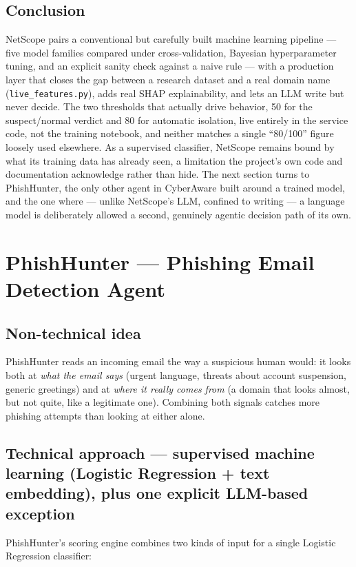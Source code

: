 \documentclass[12pt,a4paper]{report}
\newcommand{\ProjectName}{CyberAware}
\begin{document}
\subsection*{Conclusion}
NetScope pairs a conventional but carefully built machine learning pipeline --- five model families compared under cross-validation, Bayesian hyperparameter tuning, and an explicit sanity check against a naive rule --- with a production layer that closes the gap between a research dataset and a real domain name (\texttt{live\_features.py}), adds real SHAP explainability, and lets an LLM write but never decide. The two thresholds that actually drive behavior, 50 for the suspect/normal verdict and 80 for automatic isolation, live entirely in the service code, not the training notebook, and neither matches a single ``80/100'' figure loosely used elsewhere. As a supervised classifier, NetScope remains bound by what its training data has already seen, a limitation the project's own code and documentation acknowledge rather than hide. The next section turns to PhishHunter, the only other agent in \ProjectName{} built around a trained model, and the one where --- unlike NetScope's LLM, confined to writing --- a language model is deliberately allowed a second, genuinely agentic decision path of its own.

\section{PhishHunter --- Phishing Email Detection Agent}

\subsection*{Non-technical idea}
PhishHunter reads an incoming email the way a suspicious human would: it looks both at \emph{what the email says} (urgent language, threats about account suspension, generic greetings) and at \emph{where it really comes from} (a domain that looks almost, but not quite, like a legitimate one). Combining both signals catches more phishing attempts than looking at either alone.

\subsection*{Technical approach --- supervised machine learning (Logistic Regression + text embedding), plus one explicit LLM-based exception}
PhishHunter's scoring engine combines two kinds of input for a single Logistic Regression classifier:
\end{document}
